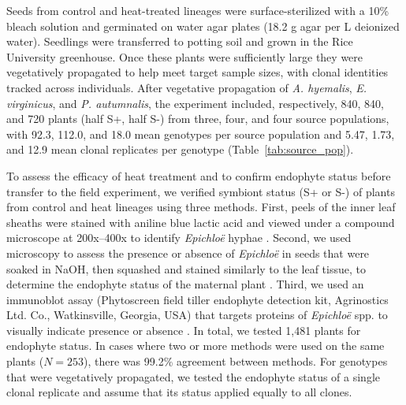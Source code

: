 \documentclass[12pt]{article}\usepackage[]{graphicx}\usepackage[dvipsnames]{xcolor}
\begin{document}
Seeds from control and heat-treated lineages were surface-sterilized with a 10\% bleach solution and germinated on water agar plates (18.2 g agar per L deionized water).
Seedlings were transferred to potting soil and grown in the Rice University greenhouse. 
Once these plants were sufficiently large they were vegetatively propagated to help meet target sample sizes, with clonal identities tracked across individuals. 
After vegetative propagation of \textit{A. hyemalis}, \textit{E. virginicus}, and \textit{P. autumnalis}, the experiment included, respectively, 840, 840, and 720 plants (half S+, half S-) from three, four, and four source populations, with 92.3, 112.0, and 18.0 mean genotypes per source population and 5.47, 1.73, and 12.9 mean clonal replicates per genotype (Table~\ref{tab:source_pop}). 

To assess the efficacy of heat treatment and to confirm endophyte status before transfer to the field experiment, we verified symbiont status (S+ or S-) of plants from control and heat lineages using three methods. 
First, peels of the inner leaf sheaths were stained with aniline blue lactic acid and viewed under a compound microscope at 200x–400x to identify \emph{Epichloë} hyphae \citep{jackson1988rapid}. 
Second, we used microscopy to assess the presence or absence of \emph{Epichloë} in seeds that were soaked in NaOH, then squashed and stained similarly to the leaf tissue, to determine the endophyte status of the maternal plant \citep{fowler2025increasing}. 
Third, we used an immunoblot assay (Phytoscreen field tiller endophyte detection kit, Agrinostics Ltd. Co., Watkinsville, Georgia, USA) that targets proteins of \emph{Epichloë} spp. to visually indicate presence or absence \citep{koh2006rapid}. 
In total, we tested 1,481 plants for endophyte status. 
In cases where two or more methods were used on the same plants ($N=253$), there was 99.2\% agreement between methods.
For genotypes that were vegetatively propagated, we tested the endophyte status of a single clonal replicate and assume that its status applied equally to all clones. 
\end{document}

